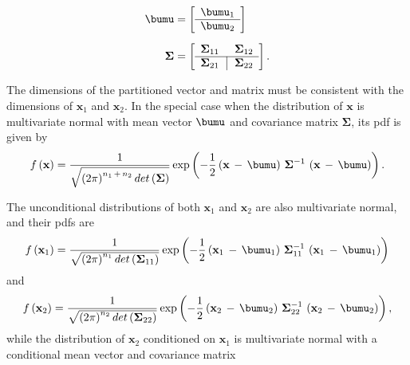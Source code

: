 \documentclass[graybox,envcountchap,sectrefs]{svmono}\usepackage[]{graphicx}\usepackage[]{xcolor}
\begin{document}
\begin{appendices}
\begin{subequations}
\begin{align}
\bumu & =\left[\begin{array}{c}
\bumu_{1}\\
\hline \bumu_{2}
\end{array}\right]\label{eq:MultivariateNormalMu}\\[0.5em]
\mathbf{\Sigma} & =\left[\begin{array}{c|c}
\mathrm{\mathbf{\Sigma}_{11}}\, & \,\mathbf{\Sigma}_{12}\\
\hline \mathbf{\Sigma}_{21}\, & \,\mathbf{\Sigma}_{22}
\end{array}\right].\label{eq:MultivariateNormalSigma}
\end{align}
\end{subequations}

The dimensions of the partitioned vector and matrix must be consistent
with the dimensions of $\mathrm{\mathbf{x}}_{1}$ and $\mathrm{\mathbf{x}}_{2}$.
In the special case when the distribution of $\mathbf{x}$ is multivariate
normal with mean vector $\bumu$ and covariance matrix $\mathbf{\Sigma}$,
its pdf is given by
\begin{equation}
f\left(\mathbf{x}\right)=\frac{1}{\sqrt{\left(2\pi\right)^{n_{1}\,+\,n_{2}}det\left(\mathbf{\Sigma}\right)}}\exp\left(-\frac{1}{2}\left(\mathrm{\mathbf{x}}\,-\,\bumu\right)\,\mathbf{\Sigma}^{-1}\,\left(\mathrm{\mathbf{x}}\,-\,\bumu\right)\right).\label{eq:MultivariateNormalDistribution1}
\end{equation}

The unconditional distributions of both $\mathrm{\mathbf{x}}_{1}$
and $\mathrm{\mathbf{x}}_{2}$ are also multivariate normal, and their
pdfs are
\begin{equation}
f\left(\mathbf{x}_{1}\right)=\frac{1}{\sqrt{\left(2\pi\right)^{n_{1}}det\left(\mathrm{\mathbf{\Sigma}_{11}}\right)}}\exp\left(-\frac{1}{2}\left(\mathrm{\mathbf{x}}_{1}\,-\,\bumu_{1}\right)\mathrm{\,\mathbf{\Sigma}_{11}^{-1}}\,\left(\mathrm{\mathbf{x}}_{1}\,-\,\bumu_{1}\right)\right)\label{eq:MultivariateNormalDistribution2}
\end{equation}
and
\begin{equation}
f\left(\mathbf{x}_{2}\right)=\frac{1}{\sqrt{\left(2\pi\right)^{n_{2}}det\left(\mathbf{\Sigma}_{22}\right)}}\exp\left(-\frac{1}{2}\left(\mathrm{\mathbf{x}}_{2}\,-\,\bumu_{2}\right)\,\mathbf{\Sigma}_{22}^{-1}\,\left(\mathrm{\mathbf{x}}_{2}\,-\,\bumu_{2}\right)\right),\label{eq:MultivariateNormalDistribution3}
\end{equation}
while the distribution of $\mathrm{\mathbf{x}}_{2}$ conditioned on
$\mathrm{\mathbf{x}}_{1}$ is multivariate normal with a conditional
mean vector and covariance matrix


\end{appendices}
\end{document}
